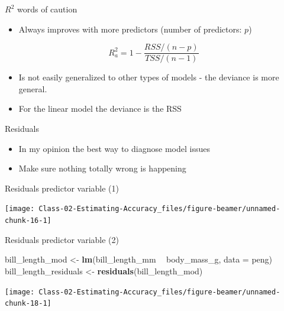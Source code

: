\documentclass[
  ignorenonframetext,
]{beamer}
\newenvironment{Shaded}{\begin{snugshade}}{\end{snugshade}}
\newcommand{\DataTypeTok}[1]{\textcolor[rgb]{0.13,0.29,0.53}{#1}}
\newcommand{\KeywordTok}[1]{\textcolor[rgb]{0.13,0.29,0.53}{\textbf{#1}}}
\newcommand{\NormalTok}[1]{#1}
\newcommand{\OperatorTok}[1]{\textcolor[rgb]{0.81,0.36,0.00}{\textbf{#1}}}
\newcommand{\StringTok}[1]{\textcolor[rgb]{0.31,0.60,0.02}{#1}}
\providecommand{\tightlist}{%
  \setlength{\itemsep}{0pt}\setlength{\parskip}{0pt}}
\begin{document}
\begin{frame}{\(R^2\) words of caution}
\protect\hypertarget{r2-words-of-caution}{}

\begin{itemize}
\tightlist
\item
  Always improves with more predictors (number of predictors: \(p\))
\end{itemize}

\[
R_a^2 = 1 - \frac{RSS/(n-p)}{TSS/(n-1)}
\]

\begin{itemize}
\tightlist
\item
  Is not easily generalized to other types of models - the deviance is
  more general.
\item
  For the linear model the deviance is the RSS
\end{itemize}

\end{frame}

\begin{frame}{Residuals}
\protect\hypertarget{residuals}{}

\begin{itemize}
\tightlist
\item
  In my opinion the best way to diagnose model issues
\item
  Make sure nothing totally wrong is happening
\end{itemize}

\end{frame}

\begin{frame}{Residuals \textbar{} predictor variable (1)}
\protect\hypertarget{residuals-predictor-variable-1}{}

\begin{center}\texttt{[image: Class-02-Estimating-Accuracy\_files/figure-beamer/unnamed-chunk-16-1]} \end{center}

\end{frame}

\begin{frame}[fragile]{Residuals \textbar{} predictor variable (2)}
\protect\hypertarget{residuals-predictor-variable-2}{}

\begin{Shaded}
\begin{Highlighting}[]
\NormalTok{bill_length_mod <-}\StringTok{ }\KeywordTok{lm}\NormalTok{(bill_length_mm }\OperatorTok{~}\StringTok{ }\NormalTok{body_mass_g, }\DataTypeTok{data =}\NormalTok{ peng)}
\NormalTok{bill_length_residuals <-}\StringTok{ }\KeywordTok{residuals}\NormalTok{(bill_length_mod)}
\end{Highlighting}
\end{Shaded}

\begin{center}\texttt{[image: Class-02-Estimating-Accuracy\_files/figure-beamer/unnamed-chunk-18-1]} \end{center}

\end{frame}
\end{document}
